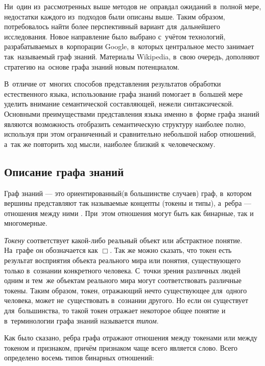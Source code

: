 Ни~один из~рассмотренных выше методов не~оправдал ожиданий в~полной мере, 
недостатки каждого из~подходов были описаны выше.
Таким образом, потребовалось найти более перспективный вариант для~дальнейшего исследования.
Новое направление было выбрано с~учётом технологий, 
разрабатываемых в~корпорации Google, в~которых центральное место занимает  так~называемый граф знаний.
Материалы Wikipedia, в~свою очередь, дополняют стратегию на~основе графа знаний новым потенциалом.

В~отличие от~многих способов представления результатов обработки естественного языка,
 использование графа знаний помогает в~большей мере уделить внимание семантической составляющей, нежели синтаксической. 
Основными преимуществами представления языка именно в~форме графа знаний являются 
возможность отобразить семантическую структуру наиболее полно, 
используя при этом ограниченный и сравнительно небольшой набор отношений, 
а~так же повторить ход мысли, наиболее близкий к~человеческому.

\subsection {Описание графа знаний}

Граф знаний --- это ориентированный(в большинстве случаев) граф, 
в~котором вершины представляют так называемые концепты (токены и типы),
а~ребра --- отношения между ними \cite{knowledge_graph}.
При~этом отношения могут быть как бинарные, так и многомерные. 

\textsl{Токену} соответствует какой-либо реальный объект или абстрактное понятие.
На~графе он обозначается как $\Box$. 
Так же можно сказать, что токен есть результат восприятия объекта реального мира или понятия, 
существующего только в~сознании конкретного человека.
С~точки зрения различных людей одним и тем~же объектам реального мира могут соответствовать различные токены.
Таким образом, токен, отражающий нечто существующее для~одного человека, может не~существовать в~сознании другого. 
Но если он существует для~большинства, то такой токен отражает некоторое общее понятие и 
в~терминологии графа знаний называется \textsl{типом}.


Как было сказано, ребра графа отражают отношения между токенами или между токеном и признаком, 
причём признаком чаще всего является слово. 
Всего определено восемь типов бинарных отношений:

